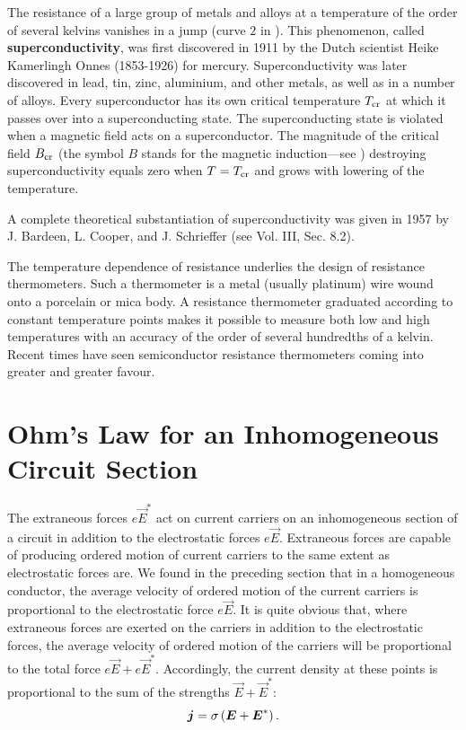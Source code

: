 The resistance of a large group of metals and alloys at a temperature of the order of several kelvins vanishes in a jump (curve $2$ in ). This phenomenon, called \textbf{superconductivity}, was first discovered in 1911 by the Dutch scientist Heike Kamerlingh Onnes (1853-1926) for mercury. Superconductivity was later discovered in lead, tin, zinc, aluminium, and other metals, as well as in a number of alloys. Every superconductor has its own critical temperature $T_{\text{cr}}$ at which it passes over into a superconducting state. The superconducting state is violated when a magnetic field acts on a superconductor. The magnitude of the critical field $B_{\text{cr}}$ (the symbol $B$ stands for the magnetic induction---see ) destroying superconductivity equals zero when $T=T_{\text{cr}}$ and grows with lowering of the temperature.

A complete theoretical substantiation of superconductivity was given in 1957 by J. Bardeen, L. Cooper, and J. Schrieffer (see Vol. III, Sec. 8.2).

The temperature dependence of resistance underlies the design of resistance thermometers. Such a thermometer is a metal (usually platinum) wire wound onto a porcelain or mica body. A resistance thermometer graduated according to constant temperature points makes it possible to measure both low and high temperatures with an accuracy of the order of several hundredths of a kelvin. Recent times have seen semiconductor resistance thermometers coming into greater and greater favour.

\section{Ohm's Law for an Inhomogeneous Circuit Section}\label{sec:5_5}

The extraneous forces $e\vec{E}^*$ act on current carriers on an inhomogeneous section of a circuit in addition to the electrostatic forces $e\vec{E}$. Extraneous forces are capable of producing ordered motion of current carriers to the same extent as electrostatic forces are. We found in the preceding section that in a homogeneous conductor, the average velocity of ordered motion of the current carriers is proportional to the electrostatic force $e\vec{E}$. It is quite obvious that, where extraneous forces are exerted on the carriers in addition to the electrostatic forces, the average velocity of ordered motion of the carriers will be proportional to the total force $e\vec{E}+ e\vec{E}^*$. Accordingly, the current density at these points is proportional to the sum of the strengths $\vec{E}+\vec{E}^*$:
\vspace{-12pt}
\begin{equation}\label{eq:5_25}
    \boldsymbol{j} = \sigma \left(\boldsymbol{E}+\boldsymbol{E}^*\right).
\end{equation}

